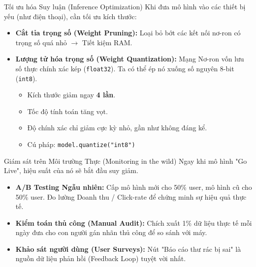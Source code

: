 \documentclass[aspectratio=169]{beamer}
\begin{document}
\begin{frame}{Tối ưu hóa Suy luận (Inference Optimization)}
    Khi đưa mô hình vào các thiết bị yếu (như điện thoại), cần tối ưu kích thước:
    \begin{itemize}
        \item \textbf{Cắt tỉa trọng số (Weight Pruning):} Loại bỏ bớt các kết nối nơ-ron có trọng số quá nhỏ $\rightarrow$ Tiết kiệm RAM.
        \item \textbf{Lượng tử hóa trọng số (Weight Quantization):} Mạng Nơ-ron vốn lưu số thực chính xác kép (\texttt{float32}). Ta có thể ép nó xuống số nguyên 8-bit (\texttt{int8}).
        \begin{itemize}
            \item Kích thước giảm ngay \textbf{4 lần}.
            \item Tốc độ tính toán tăng vọt.
            \item Độ chính xác chỉ giảm cực kỳ nhỏ, gần như không đáng kể.
            \item Cú pháp: \texttt{model.quantize("int8")}
        \end{itemize}
    \end{itemize}
\end{frame}

\begin{frame}{Giám sát trên Môi trường Thực (Monitoring in the wild)}
    Ngay khi mô hình "Go Live", hiệu suất của nó sẽ bắt đầu suy giảm.
    \begin{itemize}
        \item \textbf{A/B Testing Ngẫu nhiên:} Cấp mô hình mới cho 50\% user, mô hình cũ cho 50\% user. Đo lường Doanh thu / Click-rate để chứng minh sự hiệu quả thực tế.
        \item \textbf{Kiểm toán thủ công (Manual Audit):} Chích xuất 1\% dữ liệu thực tế mỗi ngày đưa cho con người gán nhãn thủ công để so sánh với máy.
        \item \textbf{Khảo sát người dùng (User Surveys):} Nút "Báo cáo thư rác bị sai" là nguồn dữ liệu phản hồi (Feedback Loop) tuyệt vời nhất.
    \end{itemize}
\end{frame}
\end{document}
